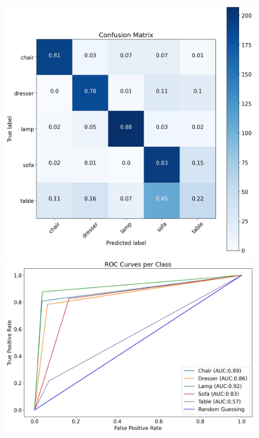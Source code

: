 \documentclass[11pt,a4paper]{article}
\begin{document}
\begin{figure}[H]
{{    \includegraphics[scale=0.13]{imgs/experiments/images/12/Experiment-12-TESTING-confusion-matrix.jpg}
    \includegraphics[scale=0.13]{imgs/experiments/images/12/Experiment-12-TESTING-ROC.jpg}
    }}
    \qquad
\end{figure}
\end{document}
